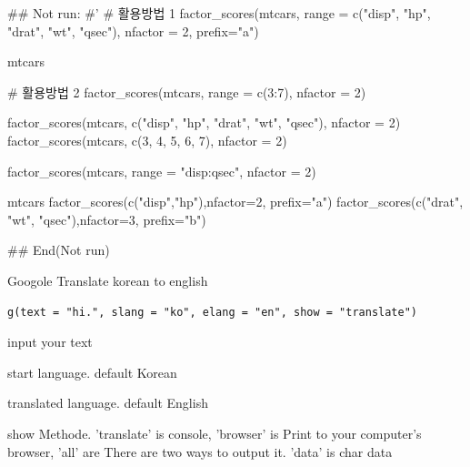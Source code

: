 \documentclass[a4paper]{book}
\begin{document}
\begin{Examples}
\begin{ExampleCode}


## Not run: 
#'
# 활용방법 1
factor_scores(mtcars,
              range = c("disp", "hp", "drat", "wt", "qsec"),
              nfactor = 2, prefix="a")

mtcars %

# 활용방법 2
factor_scores(mtcars, range = c(3:7), nfactor = 2)

factor_scores(mtcars, c("disp", "hp", "drat", "wt", "qsec"), nfactor = 2)
factor_scores(mtcars, c(3, 4, 5, 6, 7), nfactor = 2)

factor_scores(mtcars, range = "disp:qsec", nfactor = 2)


mtcars %
  factor_scores(c("disp","hp"),nfactor=2, prefix="a") %
  factor_scores(c("drat", "wt", "qsec"),nfactor=3, prefix="b") %


## End(Not run)
\end{ExampleCode}
\end{Examples}
%
\begin{Description}
Googole Translate korean to english
\end{Description}
%
\begin{Usage}
\begin{verbatim}
g(text = "hi.", slang = "ko", elang = "en", show = "translate")
\end{verbatim}
\end{Usage}
%
\begin{Arguments}
\begin{ldescription}
\item[\code{text}] input your text

\item[\code{slang}] start language. default Korean

\item[\code{elang}] translated language. default English

\item[\code{show}] show Methode. 'translate' is console, 'browser'  is Print to your computer's browser, 'all' are There are two ways to output it. 'data' is char data
\end{ldescription}
\end{Arguments}
%
\end{document}

